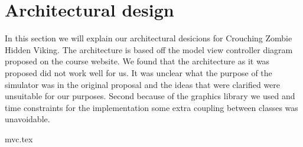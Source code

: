 \chapter{Architectural design}
In this section we will explain our architectural desicions for Crouching Zombie Hidden Viking. The architecture is based off the model view controller diagram proposed on the course website. We found that the architecture as it was proposed did not work well for us. It was unclear what the purpose of the simulator was in the original proposal and the ideas that were clarified were unsuitable for our purposes. Second because of the graphics library we used and time constraints for the implementation some extra coupling between classes was unavoidable.

{mvc.tex}